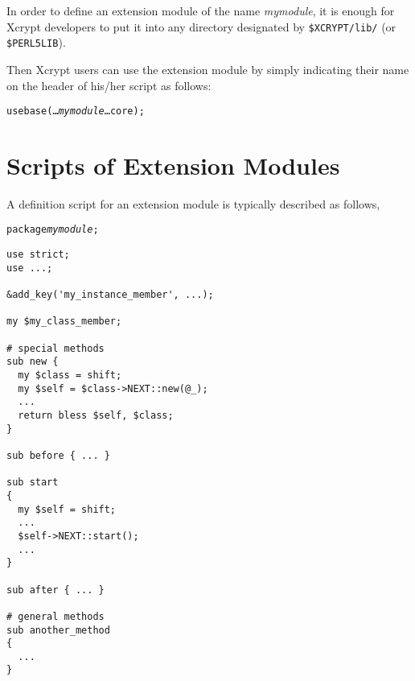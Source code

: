 \documentclass[a4paper,10pt]{report}
\def\|{\verb|} %|
\begin{document}
In order to define an extension module of the name \textit{mymodule},
it is enough for Xcrypt developers to put it into any directory
designated by \|$XCRYPT/lib/| (or \|$PERL5LIB|).

Then Xcrypt users can use the extension module by simply indicating
their name on the header of his/her script as follows:
\begin{screen}
\begin{alltt}
use base (\ldots {\it mymodule} \ldots core);
\end{alltt}
\end{screen}


\section{Scripts of Extension Modules}

A definition script for an extension module is typically described as follows,
\begin{boxnote}
  \begin{alltt}
package {\it mymodule};
  \end{alltt}
\begin{verbatim}
use strict;
use ...;

&add_key('my_instance_member', ...);

my $my_class_member;

# special methods
sub new {
  my $class = shift;
  my $self = $class->NEXT::new(@_);
  ... 
  return bless $self, $class;
}

sub before { ... }

sub start
{
  my $self = shift;
  ...
  $self->NEXT::start();
  ...
}

sub after { ... }

# general methods
sub another_method
{
  ...
}
\end{verbatim}
\end{boxnote}%
\vspace{\baselineskip}
\end{document}
